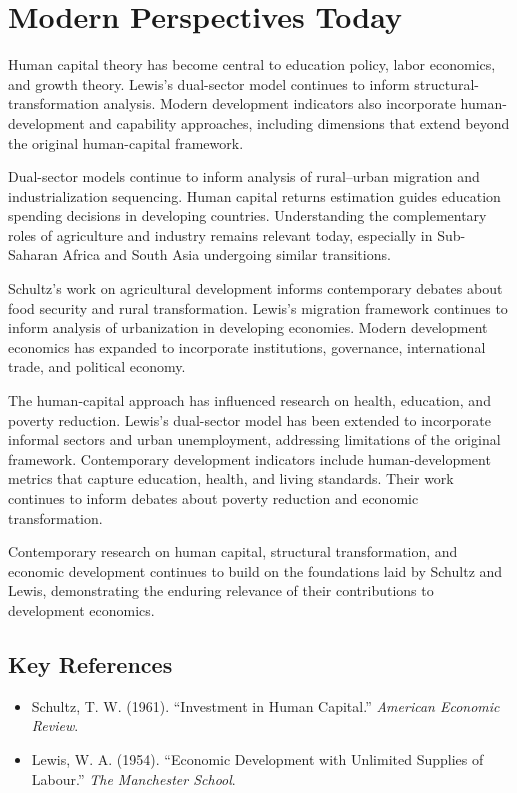 \section{Modern Perspectives Today}
Human capital theory has become central to education policy, labor economics, and growth theory.
Lewis's dual-sector model continues to inform structural-transformation analysis. Modern
development indicators also incorporate human-development and capability approaches, including
dimensions that extend beyond the original human-capital framework.

Dual-sector models continue to inform analysis of rural--urban migration and industrialization
sequencing. Human capital returns estimation guides education spending decisions in developing
countries. Understanding the complementary roles of agriculture and industry remains relevant
today, especially in Sub-Saharan Africa and South Asia undergoing similar transitions.

Schultz's work on agricultural development informs contemporary debates about food security and
rural transformation. Lewis's migration framework continues to inform analysis of urbanization in
developing economies. Modern development economics has expanded to incorporate institutions,
governance, international trade, and political economy.

The human-capital approach has influenced research on health, education, and poverty reduction.
Lewis's dual-sector model has been extended to incorporate informal sectors and urban unemployment,
addressing limitations of the original framework. Contemporary development indicators include
human-development metrics that capture education, health, and living standards. Their work
continues to inform debates about poverty reduction and economic transformation.

Contemporary research on human capital, structural transformation, and economic development
continues to build on the foundations laid by Schultz and Lewis, demonstrating the enduring
relevance of their contributions to development economics.

\subsection*{Key References}
\begin{itemize}
    \item Schultz, T. W. (1961). ``Investment in Human Capital.''
    \textit{American Economic Review}.
    \item Lewis, W. A. (1954). ``Economic Development with Unlimited Supplies of Labour.''
    \textit{The Manchester School}.
\end{itemize}
